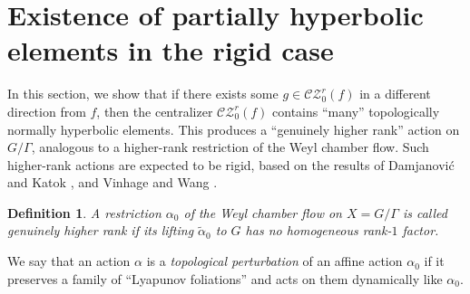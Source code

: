 \documentclass[11pt]{amsart}
\numberwithin{equation}{section}
\newcommand{\CZ}{\mathcal{CZ}}
\theoremstyle{plain}
\newtheorem{defi}{Definition}[section]
\begin{document}
\section{Existence of partially hyperbolic elements in the rigid case}\label{eph}

In this section, we show that if there exists some $g\in\CZ^r_0(f)$ in a different direction from $f$, then the centralizer $\CZ^r_0(f)$ contains ``many'' topologically normally hyperbolic elements. This produces a ``genuinely higher rank'' action on $G/\Gamma$, analogous to a higher-rank restriction of the Weyl chamber flow. Such higher-rank actions are expected to be rigid, based on the results of Damjanovi\'c and Katok \cite{DK}, and Vinhage and Wang \cite{VinWang}.

\begin{defi}
 A restriction $\alpha_0$ of the Weyl chamber flow on $X=G/\Gamma$ is called \emph{genuinely higher rank} if its lifting $\tilde{\alpha}_0$ to $G$ has no homogeneous rank-$1$ factor.
\end{defi}

We say that an action $\alpha$ is a \emph{topological perturbation} of an affine action $\alpha_0$ if it preserves a family of ``Lyapunov foliations'' and acts on them dynamically like $\alpha_0$. 
\end{document}
